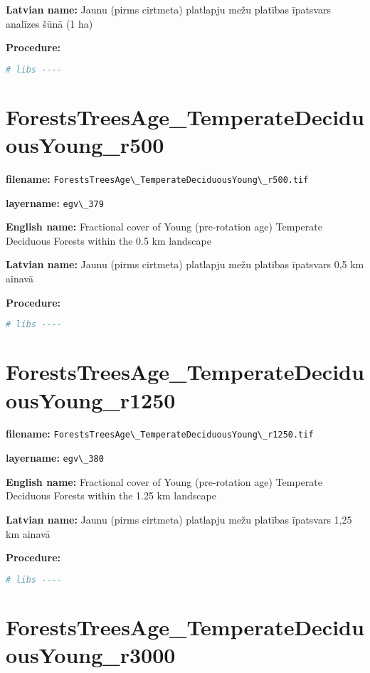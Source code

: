\documentclass[
]{book}
\newcommand{\passthrough}[1]{#1}
\begin{document}
\textbf{Latvian name:} Jaunu (pirms cirtmeta) platlapju mežu platības īpatsvars analīzes šūnā (1 ha)

\textbf{Procedure:}

\begin{lstlisting}[language=R]
# libs ----
\end{lstlisting}

\section{ForestsTreesAge\_TemperateDeciduousYoung\_r500}\label{ch06.379}

\textbf{filename:} \passthrough{\lstinline!ForestsTreesAge\_TemperateDeciduousYoung\_r500.tif!}

\textbf{layername:} \passthrough{\lstinline!egv\_379!}

\textbf{English name:} Fractional cover of Young (pre-rotation age) Temperate Deciduous Forests within the 0.5 km landscape

\textbf{Latvian name:} Jaunu (pirms cirtmeta) platlapju mežu platības īpatsvars 0,5 km ainavā

\textbf{Procedure:}

\begin{lstlisting}[language=R]
# libs ----
\end{lstlisting}

\section{ForestsTreesAge\_TemperateDeciduousYoung\_r1250}\label{ch06.380}

\textbf{filename:} \passthrough{\lstinline!ForestsTreesAge\_TemperateDeciduousYoung\_r1250.tif!}

\textbf{layername:} \passthrough{\lstinline!egv\_380!}

\textbf{English name:} Fractional cover of Young (pre-rotation age) Temperate Deciduous Forests within the 1.25 km landscape

\textbf{Latvian name:} Jaunu (pirms cirtmeta) platlapju mežu platības īpatsvars 1,25 km ainavā

\textbf{Procedure:}

\begin{lstlisting}[language=R]
# libs ----
\end{lstlisting}

\section{ForestsTreesAge\_TemperateDeciduousYoung\_r3000}\label{ch06.381}
\end{document}
